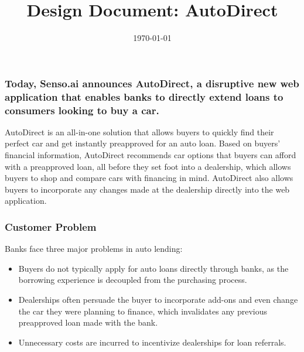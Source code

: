 \documentclass[fontsize=14pt]{article}
\title{\vspace{-1.5cm} Design Document: AutoDirect \vspace{-0.5cm}}
\date{\today}
\begin{document}
\large

\maketitle

\subsubsection*{\large Today, Senso.ai announces AutoDirect, a disruptive new web application that enables banks to directly extend loans to consumers looking to buy a car.}

AutoDirect is an all-in-one solution that allows buyers to quickly find their perfect car and get instantly preapproved for an auto loan. Based on buyers' financial information, AutoDirect recommends car options that buyers can afford with a preapproved loan, all before they set foot into a dealership, which allows buyers to shop and compare cars with financing in mind. AutoDirect also allows buyers to incorporate any changes made at the dealership directly into the web application.

\subsubsection*{\large Customer Problem}

Banks face three major problems in auto lending:
\begin{itemize}
    \item Buyers do not typically apply for auto loans directly through banks, as the borrowing experience is decoupled from the purchasing process. 
    
    \item Dealerships often persuade the buyer to incorporate add-ons and even change the car they were planning to finance, which invalidates any previous preapproved loan made with the bank.
    
    \item Unnecessary costs are incurred to incentivize dealerships for loan referrals.
\end{itemize}


\end{document}
